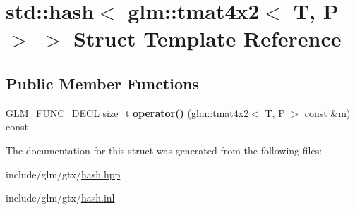 \hypertarget{structstd_1_1hash_3_01glm_1_1tmat4x2_3_01T_00_01P_01_4_01_4}{}\section{std\+:\+:hash$<$ glm\+:\+:tmat4x2$<$ T, P $>$ $>$ Struct Template Reference}
\label{structstd_1_1hash_3_01glm_1_1tmat4x2_3_01T_00_01P_01_4_01_4}
\subsection*{Public Member Functions}
\begin{DoxyCompactItemize}
\item 
\mbox{\label{structstd_1_1hash_3_01glm_1_1tmat4x2_3_01T_00_01P_01_4_01_4_af4488eb7a221447f2f833ce12549bd16}} 
G\+L\+M\+\_\+\+F\+U\+N\+C\+\_\+\+D\+E\+CL size\+\_\+t {\bfseries operator()} (\hyperlink{structglm_1_1tmat4x2}{glm\+::tmat4x2}$<$ T, P $>$ const \&m) const
\end{DoxyCompactItemize}


The documentation for this struct was generated from the following files\+:\begin{DoxyCompactItemize}
\item 
include/glm/gtx/\hyperlink{hash_8hpp}{hash.\+hpp}\item 
include/glm/gtx/\hyperlink{hash_8inl}{hash.\+inl}\end{DoxyCompactItemize}

